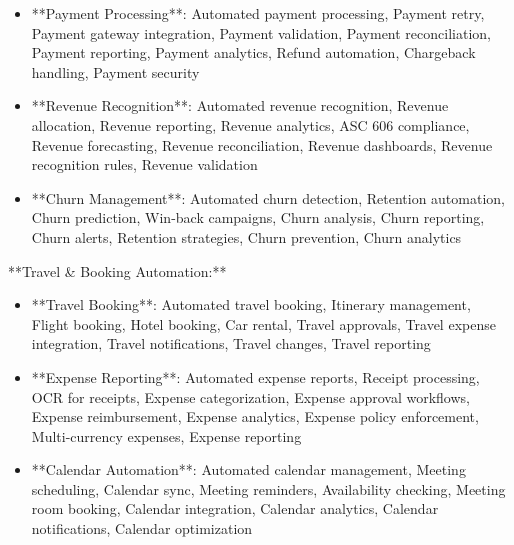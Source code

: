\documentclass[11pt,a4paper]{article}
\begin{document}
\begin{itemize}
\item **Payment Processing**: Automated payment processing, Payment retry, Payment gateway integration, Payment validation, Payment reconciliation, Payment reporting, Payment analytics, Refund automation, Chargeback handling, Payment security
\end{itemize}

\begin{itemize}
\item **Revenue Recognition**: Automated revenue recognition, Revenue allocation, Revenue reporting, Revenue analytics, ASC 606 compliance, Revenue forecasting, Revenue reconciliation, Revenue dashboards, Revenue recognition rules, Revenue validation
\end{itemize}

\begin{itemize}
\item **Churn Management**: Automated churn detection, Retention automation, Churn prediction, Win-back campaigns, Churn analysis, Churn reporting, Churn alerts, Retention strategies, Churn prevention, Churn analytics
\end{itemize}

**Travel \& Booking Automation:**

\begin{itemize}
\item **Travel Booking**: Automated travel booking, Itinerary management, Flight booking, Hotel booking, Car rental, Travel approvals, Travel expense integration, Travel notifications, Travel changes, Travel reporting
\end{itemize}

\begin{itemize}
\item **Expense Reporting**: Automated expense reports, Receipt processing, OCR for receipts, Expense categorization, Expense approval workflows, Expense reimbursement, Expense analytics, Expense policy enforcement, Multi-currency expenses, Expense reporting
\end{itemize}

\begin{itemize}
\item **Calendar Automation**: Automated calendar management, Meeting scheduling, Calendar sync, Meeting reminders, Availability checking, Meeting room booking, Calendar integration, Calendar analytics, Calendar notifications, Calendar optimization
\end{itemize}
\end{document}
